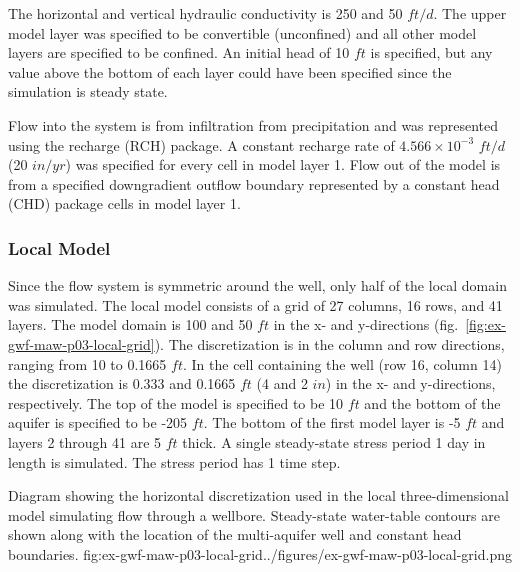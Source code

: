 The horizontal and vertical hydraulic conductivity is 250 and 50 $ft/d$. The upper model layer was specified to be convertible (unconfined) and all other model layers are specified to be confined. An initial head of 10 $ft$ is specified, but any value above the bottom of each layer could have been specified since the simulation is steady state. 

Flow into the system is from infiltration from precipitation and was represented using the recharge (RCH) package. A constant recharge rate of $4.566 \times 10^{-3}$ $ft/d$ (20 $in/yr$) was specified for every cell in model layer 1. Flow out of the model is from a specified downgradient outflow boundary represented by a constant head (CHD) package cells in model layer 1.

\subsubsection{Local Model}

Since the flow system is symmetric around the well, only half of the local domain was simulated. The local model consists of a grid of 27 columns, 16 rows, and 41 layers. The model domain is 100 and 50 $ft$ in the x- and y-directions (fig.~\ref{fig:ex-gwf-maw-p03-local-grid}). The discretization is in the column and row directions, ranging from 10 to 0.1665 $ft$. In the cell containing the well (row 16, column 14) the discretization is 0.333 and 0.1665 $ft$ (4 and 2 $in$) in the x- and y-directions, respectively. The top of the model is specified to be 10 $ft$ and the bottom of the aquifer is specified to be -205 $ft$. The bottom of the first model layer is -5 $ft$ and layers 2 through 41 are 5 $ft$ thick. A single steady-state stress period 1 day in length is simulated. The stress period has 1 time step.


\begin{StandardFigure}{
                                     Diagram showing the horizontal discretization used in the local three-dimensional
                                     model simulating flow through a wellbore. Steady-state water-table contours are 
                                     shown along with the location of the multi-aquifer well and constant head boundaries. 
                                     }{fig:ex-gwf-maw-p03-local-grid}{../figures/ex-gwf-maw-p03-local-grid.png}
\end{StandardFigure}   

